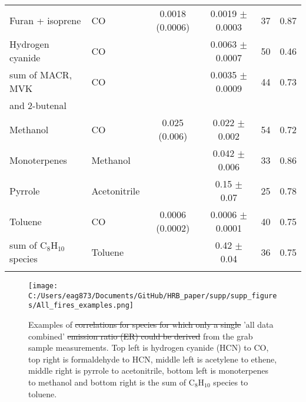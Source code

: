 \documentclass[acp, manuscript]{copernicus}
\providecommand{\DIFadd}[1]{{\protect\color{blue}\uwave{#1}}} %
\providecommand{\DIFdel}[1]{{\protect\color{red}\sout{#1}}}                      %
\providecommand{\DIFaddFL}[1]{\DIFadd{#1}} %
\providecommand{\DIFdelFL}[1]{\DIFdel{#1}} %
\providecommand{\DIFaddbeginFL}{} %
\providecommand{\DIFaddendFL}{} %
\providecommand{\DIFdelbeginFL}{} %
\providecommand{\DIFdelendFL}{} %
\begin{document}
\begin{table}
\begin{tabular}{l l c c  l l }
    Furan + isoprene & CO & 0.0018 (0.0006) & 0.0019 $\pm$ 0.0003 &37& 0.87 \\
    Hydrogen cyanide & CO & & 0.0063 $\pm$ 0.0007 &50& 0.46 \\
    sum of MACR, MVK  & CO & & 0.0035 $\pm$ 0.0009 &44& 0.73 \\
    and 2-butenal& & & & & \\
    Methanol & CO & 0.025 (0.006)\DIFaddbeginFL \DIFaddFL{$^c$ }\DIFaddendFL & 0.022 $\pm$ 0.002 &54& 0.72\\
    Monoterpenes & Methanol & &0.042 $\pm$ 0.006 &33& 0.86 \\
    Pyrrole & Acetonitrile & &0.15 $\pm$ 0.07 &25& 0.78 \\
    Toluene& CO & 0.0006 (0.0002) & 0.0006 $\pm$ 0.0001 &40& 0.75 \\
    sum of C$_8$H$_{10}$ species& Toluene & & 0.42 $\pm$ 0.04 &36& 0.75 \\
    \bottomhline
  \end{tabular}
  \DIFdelbeginFL %

\DIFdelendFL \DIFaddbeginFL {} \DIFaddendFL %
  \label{table:grab}
\end{table}

\begin{figure}
  \texttt{[image: C:/Users/eag873/Documents/GitHub/HRB\_paper/supp/supp\_figures/All\_fires\_examples.png]}
  \caption{Examples of \DIFdelbeginFL \DIFdelFL{correlations for species for which only a single }\DIFdelendFL 'all data combined' \DIFdelbeginFL \DIFdelFL{emission ratio (ER) could be derived }\DIFdelendFL \DIFaddbeginFL \DIFaddFL{correlations }\DIFaddendFL from the grab sample measurements. Top left is hydrogen cyanide (HCN) to CO, top right is formaldehyde to HCN, middle left is acetylene to ethene, middle right is pyrrole to acetonitrile, bottom left is monoterpenes to methanol and bottom right is the sum of C$_8$H$_{10}$ species to toluene.}
  \label{fig:all_data}
\end{figure}
\end{document}

